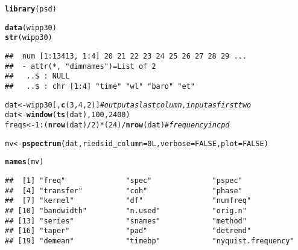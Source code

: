 \documentclass[11pt]{article}\usepackage[]{graphicx}\usepackage[]{color}
\makeatletter
\newcommand{\hlnum}[1]{\textcolor[rgb]{0.686,0.059,0.569}{#1}}%
\newcommand{\hlcom}[1]{\textcolor[rgb]{0.678,0.584,0.686}{\textit{#1}}}%
\newcommand{\hlopt}[1]{\textcolor[rgb]{0,0,0}{#1}}%
\newcommand{\hlstd}[1]{\textcolor[rgb]{0.345,0.345,0.345}{#1}}%
\newcommand{\hlkwb}[1]{\textcolor[rgb]{0.69,0.353,0.396}{#1}}%
\newcommand{\hlkwc}[1]{\textcolor[rgb]{0.333,0.667,0.333}{#1}}%
\newcommand{\hlkwd}[1]{\textcolor[rgb]{0.737,0.353,0.396}{\textbf{#1}}}%
\newenvironment{kframe}{%
 \def\at@end@of@kframe{}%
 \ifinner\ifhmode%
  \def\at@end@of@kframe{\end{minipage}}%
  \begin{minipage}{\columnwidth}%
 \fi\fi%
 \def\FrameCommand##1{\hskip\@totalleftmargin \hskip-\fboxsep
 \colorbox{shadecolor}{##1}\hskip-\fboxsep
     \hskip-\linewidth \hskip-\@totalleftmargin \hskip\columnwidth}%
 \MakeFramed {\advance\hsize-\width
   \@totalleftmargin\z@ \linewidth\hsize
   \@setminipage}}%
 {\par\unskip\endMakeFramed%
 \at@end@of@kframe}
\newenvironment{knitrout}{}{} %
\makeatother
\begin{document}
\begin{knitrout}
\color{fgcolor}\begin{kframe}
\begin{alltt}
\hlkwd{library}\hlstd{(psd)}
\end{alltt}


{\ttfamily\noindent\itshape\color{messagecolor}{\#\# Loaded psd (2.0.0) -- Adaptive multitaper spectrum estimation; to start, see ?pspectrum}}\begin{alltt}
\hlkwd{data}\hlstd{(wipp30)}
\hlkwd{str}\hlstd{(wipp30)}
\end{alltt}
\begin{verbatim}
##  num [1:13413, 1:4] 20 21 22 23 24 25 26 27 28 29 ...
##  - attr(*, "dimnames")=List of 2
##   ..$ : NULL
##   ..$ : chr [1:4] "time" "wl" "baro" "et"
\end{verbatim}
\begin{alltt}
\hlstd{dat} \hlkwb{<-} \hlstd{wipp30[,} \hlkwd{c}\hlstd{(}\hlnum{3}\hlstd{,}\hlnum{4}\hlstd{,}\hlnum{2}\hlstd{)]} \hlcom{# output as last column, input as first two}
\hlstd{dat} \hlkwb{<-} \hlkwd{window}\hlstd{(}\hlkwd{ts}\hlstd{(dat),} \hlnum{100}\hlstd{,} \hlnum{2400}\hlstd{)}
\hlstd{freqs} \hlkwb{<-} \hlnum{1}\hlopt{:}\hlstd{(}\hlkwd{nrow}\hlstd{(dat)}\hlopt{/}\hlnum{2}\hlstd{)} \hlopt{*} \hlstd{(}\hlnum{24}\hlstd{)} \hlopt{/} \hlkwd{nrow}\hlstd{(dat)} \hlcom{# frequency in cpd}
\end{alltt}
\end{kframe}
\end{knitrout}

\begin{knitrout}
\color{fgcolor}\begin{kframe}
\begin{alltt}
\hlstd{mv} \hlkwb{<-} \hlkwd{pspectrum}\hlstd{(dat,} \hlkwc{riedsid_column}\hlstd{=} \hlnum{0L}\hlstd{,} \hlkwc{verbose} \hlstd{=} \hlnum{FALSE}\hlstd{,} \hlkwc{plot} \hlstd{=} \hlnum{FALSE}\hlstd{)}
\end{alltt}
\end{kframe}
\end{knitrout}


\begin{knitrout}
\color{fgcolor}\begin{kframe}
\begin{alltt}
\hlkwd{names}\hlstd{(mv)}
\end{alltt}
\begin{verbatim}
##  [1] "freq"              "spec"              "pspec"            
##  [4] "transfer"          "coh"               "phase"            
##  [7] "kernel"            "df"                "numfreq"          
## [10] "bandwidth"         "n.used"            "orig.n"           
## [13] "series"            "snames"            "method"           
## [16] "taper"             "pad"               "detrend"          
## [19] "demean"            "timebp"            "nyquist.frequency"
\end{verbatim}
\end{kframe}
\end{knitrout}
\end{document}
